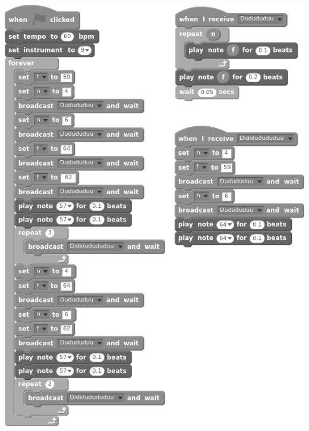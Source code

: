 \pagecolor{black!5}\afterpage{\nopagecolor}
\noindent
\includegraphics[scale=1.5]{graphics/scratch.png}

\headerfooteron{}
